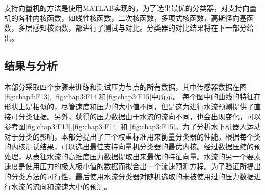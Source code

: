 支持向量机的方法是使用MATLAB实现的，为了选出最优的分类器，对支持向量机的各种内核函数，如线性核函数，二次核函数，多项式核函数，高斯径向基函数，多层感知核函数，都进行了测试与对比。分类器的对比结果将在下一部分给出。

\subsection{结果与分析 }

本部分采取四个步骤来训练和测试压力节点的所有数据，其中传感器数据在图\ref{fig:chap3:F13}, \ref{fig:chap3:F14}和\ref{fig:chap3:F15}中所示。 每个图中的曲线的特征在形状上是相似的，尽管速度和压力的大小值不同，但是这为进行水流预测提供了直接可分类证据。另外，获得的压力数据由于水流的流向不同，也会出现变化，可以参考图\ref{fig:chap3:F13},\ref{fig:chap3:F14} 和 \ref{fig:chap3:F15}。为了分析水下机器人运动对于分类的影响，本部分提出了三个权重标准用来衡量分类器的性能。根据每个类的内核测试结果，可以选出最佳支持向量机分类器的最优内核。经过数据压缩的预处理，从表征水流的高维度压力数据提取出来最优的特征向量。水流的另一个要素速度是使用压力的极大极小值的数据而拟合出一个流速预测方程。为了验证所提出的分类方法的可行性，最后使用水流分类器对随机选取的未被使用过的压力数据进行水流的流向和流速大小的预测。

